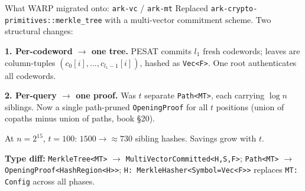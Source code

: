 \documentclass[10pt,aspectratio=169]{beamer}
\begin{document}
\begin{frame}[fragile]{What WARP migrated onto: \texttt{ark-vc} / \texttt{ark-mt}}
\small
Replaced \texttt{ark-crypto-primitives::merkle\_tree} with a multi-vector commitment scheme. Two structural changes:

\vspace{0.3em}
\textbf{1. Per-codeword $\to$ one tree.} PESAT commits $l_1$ fresh codewords; leaves are column-tuples $(c_0[i], \dots, c_{l_1-1}[i])$, hashed as \texttt{Vec<F>}. One root authenticates all codewords.

\vspace{0.3em}
\textbf{2. Per-query $\to$ one proof.} Was $t$ separate \texttt{Path<MT>}, each carrying $\log n$ siblings. Now a single path-pruned \texttt{OpeningProof} for all $t$ positions (union of copaths minus union of paths, book §20).

\vspace{0.3em}
At $n{=}2^{15}$, $t{=}100$: $1500 \to \approx 730$ sibling hashes. Savings grow with $t$.

\vspace{0.3em}
\textbf{Type diff:} \texttt{MerkleTree<MT>} $\to$ \texttt{MultiVectorCommitted<H,S,F>}; \texttt{Path<MT>} $\to$ \texttt{OpeningProof<HashRegion<H>>}; \texttt{H: MerkleHasher<Symbol{=}Vec<F>>} replaces \texttt{MT: Config} across all phases.
\end{frame}
\end{document}

